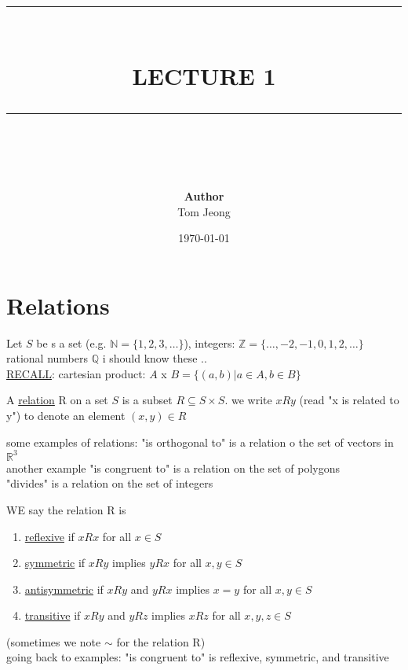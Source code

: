 \documentclass{article}
\newcommand{\HRule}[1]{\rule{\linewidth}{#1}}
\begin{document}

\title{ \normalsize \textsc{}
		\\ [2.0cm]
		\HRule{1.5pt} \\
		\LARGE \textbf{\uppercase{Lecture 1 }}
		\HRule{2.0pt} \\ [0.6cm] \LARGE{}
		}

\date{\today}
\author{\textbf{Author} \\ 
		Tom Jeong
        }

\maketitle
\newpage

\tableofcontents
\newpage


\section{Relations}
    Let $S$ be s a set (e.g. $\mathbb{N } = \{1, 2, 3, \dots\}$), integers: $\mathbb{Z} = \{\dots, -2, -1, 0, 1, 2, \dots\}$ 
    \\ 
    rational numbers $\mathbb{Q}$  i should know these .. 
 \\ 
 \underline{RECALL}: cartesian product: $A$ x $B = \{(a,b)  | a \in A, b \in B\}$  \\ 
 \begin{definition}
    A \underline{relation} R on a set $S$ is a subset $R \subseteq S \times S$. we write $xRy$ (read "x is related to y") to denote an element $(x,y) \in R$

 \end{definition} some examples of relations: "is orthogonal to" is a relation o the set of vectors in $\mathbb{R}^3$ \\ another example "is congruent to" is a relation on the set of polygons \\ 
    "divides" is a relation on the set of integers

WE say the relation R is 
\begin{enumerate}
    \item \underline{reflexive} if $xRx$ for all $x \in S$
    \item \underline{symmetric} if $xRy$ implies $yRx$ for all $x,y \in S$
    \item \underline{antisymmetric} if $xRy$ and $yRx$ implies $x=y$ for all $x,y \in S$
    \item \underline{transitive} if $xRy$ and $yRz$ implies $xRz$ for all $x,y,z \in S$
\end{enumerate} (sometimes we note $\sim$ for the relation R) \\
 going back to examples: "is congruent to" is reflexive, symmetric, and transitive \\ 
\end{document}
